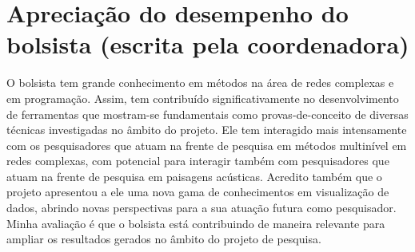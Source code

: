 \documentclass[a4paper, 11pt]{article}
\begin{document}
\section{Apreciação do desempenho do bolsista (escrita pela coordenadora)}
O bolsista tem grande conhecimento em métodos na área de redes complexas e em programação. Assim, tem contribuído significativamente no desenvolvimento de ferramentas que mostram-se fundamentais como provas-de-conceito de diversas técnicas investigadas no âmbito do projeto. Ele tem interagido mais intensamente com os pesquisadores que atuam na frente de pesquisa em métodos multinível em redes complexas, com potencial para interagir também com pesquisadores que atuam na frente de pesquisa em paisagens acústicas. Acredito também que o projeto apresentou a ele uma nova gama de conhecimentos em visualização de dados, abrindo novas perspectivas para a sua atuação futura como pesquisador. Minha avaliação é que o bolsista está contribuindo de maneira relevante para ampliar os resultados gerados no âmbito do projeto de pesquisa.


\end{document}
